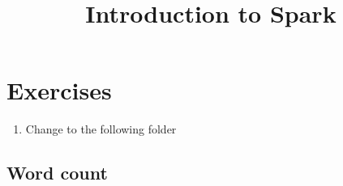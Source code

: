 \documentclass[10pt]{article}
\title{Introduction to Spark}
\begin{document}
\maketitle \makeatactive
\thispagestyle{fancy}





\section{Exercises}

\begin{enumerate}
 \item Change to the following folder

\end{enumerate}

\subsection{Word count}
\end{document}
